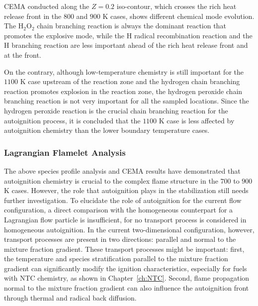 CEMA conducted along the $Z = 0.2$ iso-contour, which crosses the rich heat release front in the $800$ and $900$ K cases, shows different chemical mode evolution.  The H$_2$O$_2$ chain branching reaction is always the dominant reaction that promotes the explosive mode, while the H radical recombination reaction and the H branching reaction are less important ahead of the rich heat release front and at the front.  

On the contrary, although low-temperature chemistry is still important for the $1100$ K case upstream of the reaction zone and the hydrogen chain branching reaction promotes explosion in the reaction zone, the hydrogen peroxide chain branching reaction is not very important for all the sampled locations.  Since the hydrogen peroxide reaction is the crucial chain branching reaction for the autoignition process, it is concluded that the $1100$ K case is less affected by autoignition chemistry than the lower boundary temperature cases.  

\subsubsection{Lagrangian Flamelet Analysis} \label{sec:LFA}

The above species profile analysis and CEMA results have demonstrated that autoignition chemistry is crucial to the complex flame structure in the $700$ to $900$ K cases.  However, the role that autoignition plays in the stabilization still needs further investigation.  To elucidate the role of autoignition for the current flow configuration, a direct comparison with the homogeneous counterpart for a Lagrangian flow particle is insufficient, for no transport process is considered in homogeneous autoignition.  In the current two-dimensional configuration, however, transport processes are present in two directions: parallel and normal to the mixture fraction gradient.  These transport processes might be important: first, the temperature and species stratification parallel to the mixture fraction gradient can significantly modify the ignition characteristics, especially for fuels with NTC chemistry, as shown in Chapter~\ref{ch:NTC}.  Second, flame propagation normal to the mixture fraction gradient can also influence the autoignition front through thermal and radical back diffusion.

